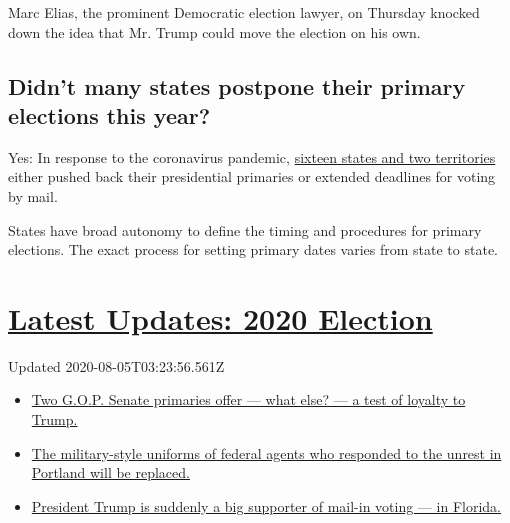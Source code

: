 Marc Elias, the prominent Democratic election lawyer, on Thursday
knocked down the idea that Mr. Trump could move the election on his own.

\hypertarget{didnt-many-states-postpone-their-primary-elections-this-year}{%
\subsection{Didn't many states postpone their primary elections this
year?}\label{didnt-many-states-postpone-their-primary-elections-this-year}}

Yes: In response to the coronavirus pandemic,
\href{https://www.nytimes.com/article/2020-campaign-primary-calendar-coronavirus.html}{sixteen
states and two territories} either pushed back their presidential
primaries or extended deadlines for voting by mail.

States have broad autonomy to define the timing and procedures for
primary elections. The exact process for setting primary dates varies
from state to state.

\hypertarget{latest-updates-2020-election}{%
\section{\texorpdfstring{\href{https://www.nytimes.com/2020/08/04/us/elections/primary-election-michigan-arizona-kansas.html?action=click\&pgtype=Article\&state=default\&region=MAIN_CONTENT_1\&context=storylines_live_updates}{Latest
Updates: 2020
Election}}{Latest Updates: 2020 Election}}\label{latest-updates-2020-election}}

Updated 2020-08-05T03:23:56.561Z

\begin{itemize}
\tightlist
\item
  \href{https://www.nytimes.com/2020/08/04/us/elections/primary-election-michigan-arizona-kansas.html?action=click\&pgtype=Article\&state=default\&region=MAIN_CONTENT_1\&context=storylines_live_updates\#link-3924dd44}{Two
  G.O.P. Senate primaries offer --- what else? --- a test of loyalty to
  Trump.}
\item
  \href{https://www.nytimes.com/2020/08/04/us/elections/primary-election-michigan-arizona-kansas.html?action=click\&pgtype=Article\&state=default\&region=MAIN_CONTENT_1\&context=storylines_live_updates\#link-62a8e06b}{The
  military-style uniforms of federal agents who responded to the unrest
  in Portland will be replaced.}
\item
  \href{https://www.nytimes.com/2020/08/04/us/elections/primary-election-michigan-arizona-kansas.html?action=click\&pgtype=Article\&state=default\&region=MAIN_CONTENT_1\&context=storylines_live_updates\#link-32b39e33}{President
  Trump is suddenly a big supporter of mail-in voting --- in Florida.}
\end{itemize}

